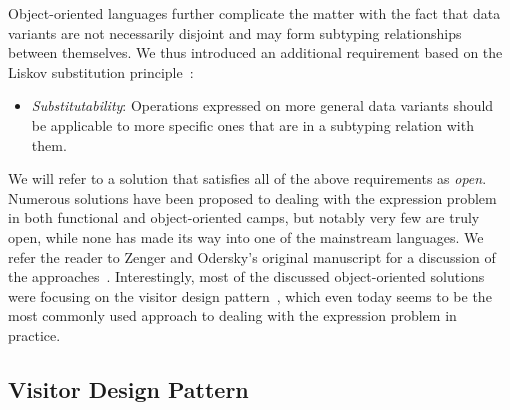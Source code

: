\documentclass[preprint]{sigplanconf}
\begin{document}

\noindent
Object-oriented languages further complicate the matter with the fact that 
data variants are not necessarily disjoint and may form subtyping relationships  
between themselves. We thus introduced an additional requirement based on the
Liskov substitution principle~\cite{Lis87}:

\begin{itemize}
\setlength{\itemsep}{0pt}
\setlength{\parskip}{0pt}
\item \emph{Substitutability}: Operations expressed on more general data variants
      should be applicable to more specific ones that are in a subtyping relation 
      with them.
\end{itemize}


\noindent
We will refer to a solution that satisfies all of the above requirements as \emph{open}. 
Numerous solutions have been proposed to dealing with the expression problem in both 
functional and object-oriented camps, but notably very few are truly open, while 
none has made its way into one of the mainstream languages. We refer the reader 
to Zenger and Odersky's original manuscript for a discussion of the 
approaches~\cite{fool12}. Interestingly, most of the discussed object-oriented 
solutions were focusing on the visitor design pattern~\cite{DesignPatterns1993}, 
which even today seems to be the most commonly used approach to dealing with the 
expression problem in practice.

\subsection{Visitor Design Pattern}
\label{sec:vdp}

\end{document}
